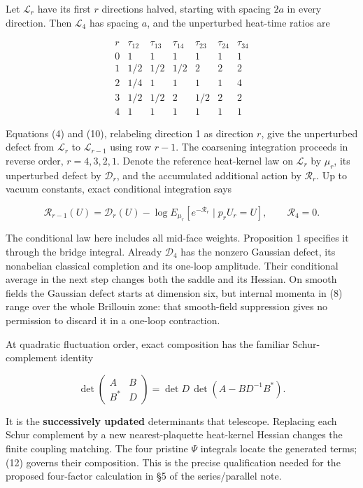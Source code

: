 \documentclass[11pt,a4paper]{article}
\begin{document}
Let \(\mathcal L_r\) have its first \(r\) directions halved, starting
with spacing \(2a\) in every direction. Then \(\mathcal L_4\) has
spacing \(a\), and the unperturbed heat-time ratios are

\[\begin{array}{c|rrrrrr}
r&\tau_{12}&\tau_{13}&\tau_{14}&\tau_{23}&\tau_{24}&\tau_{34}\\\hline
0&1&1&1&1&1&1\\
1&1/2&1/2&1/2&2&2&2\\
2&1/4&1&1&1&1&4\\
3&1/2&1/2&2&1/2&2&2\\
4&1&1&1&1&1&1
\end{array}\]

Equations (4) and (10), relabeling direction 1 as direction \(r\), give
the unperturbed defect from \(\mathcal L_r\) to \(\mathcal L_{r-1}\)
using row \(r-1\). The coarsening integration proceeds in reverse order,
\(r=4,3,2,1\). Denote the reference heat-kernel law on \(\mathcal L_r\)
by \(\mu_r\), its unperturbed defect by \(\mathcal D_r\), and the
accumulated additional action by \(\mathcal R_r\). Up to vacuum
constants, exact conditional integration says

\[\boxed{\mathcal R_{r-1}(U)=\mathcal D_r(U)
 -\log E_{\mu_r}\!\left[e^{-\mathcal R_r}\mid p_rU_r=U\right],
 \qquad\mathcal R_4=0.}\tag{12}\]

The conditional law here includes all mid-face weights. Proposition 1
specifies it through the bridge integral. Already \(\mathcal D_4\) has
the nonzero Gaussian defect, its nonabelian classical completion and its
one-loop amplitude. Their conditional average in the next step changes
both the saddle and its Hessian. On smooth fields the Gaussian defect
starts at dimension six, but internal momenta in (8) range over the
whole Brillouin zone: that smooth-field suppression gives no permission
to discard it in a one-loop contraction.

At quadratic fluctuation order, exact composition has the familiar
Schur-complement identity

\[\det\begin{pmatrix}A&B\\ B^*&D\end{pmatrix}
 =\det D\,\det(A-BD^{-1}B^*).\tag{13}\]

It is the \textbf{successively updated} determinants that telescope.
Replacing each Schur complement by a new nearest-plaquette heat-kernel
Hessian changes the finite coupling matching. The four pristine \(\Psi\)
integrals locate the generated terms; (12) governs their composition.
This is the precise qualification needed for the proposed four-factor
calculation in §5 of the series/parallel note.
\end{document}
